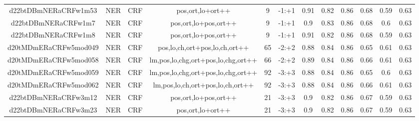 \documentclass[a4paper]{article}
\begin{document}
\begin{landscape}
\begin{center}
\begin{tabular}{ |c|c|c|c|c|c|c|c|c|c|c|c|}
 	

 
 	
 	\small{ d22btDBmNERaCRFw1m53 } & \small{ NER} & \small{  CRF }  & pos,ort,lo+ort++  &  9 &  \small{  -1:+1 }  &  0.91 & 0.82 & 0.86  &  0.68 & 0.59 & 0.63 \\
 	

 
 	
 	\small{ d22btDBmNERaCRFw1m7 } & \small{ NER} & \small{  CRF }  & pos,ort,lo+pos,ort++  &  9 &  \small{  -1:+1 }  &  0.9 & 0.83 & 0.86  &  0.68 & 0.6 & 0.63 \\
 	

 
 	
 	\small{ d22btDBmNERaCRFw1m8 } & \small{ NER} & \small{  CRF }  & pos,ort,lo+pos,ort++  &  9 &  \small{  -1:+1 }  &  0.91 & 0.82 & 0.86  &  0.68 & 0.59 & 0.63 \\
 	

 
 	
 	\small{ d20tMDmERaCRFw5mod049 } & \small{ NER} & \small{  CRF }  & pos,lo,ch,ort+pos,lo,ch,ort++  &  65 &  \small{  -2:+2 }  &  0.88 & 0.84 & 0.86  &  0.65 & 0.61 & 0.63 \\
 	

 
 	
 	\small{ d20tMDmERaCRFw5mod058 } & \small{ NER} & \small{  CRF }  & lm,pos,lo,chg,ort+pos,lo,chg,ort++  &  66 &  \small{  -2:+2 }  &  0.89 & 0.84 & 0.86  &  0.66 & 0.61 & 0.63 \\
 	

 
 	
 	\small{ d20tMDmERaCRFw5mod059 } & \small{ NER} & \small{  CRF }  & lm,pos,lo,chg,ort+pos,lo,chg,ort++  &  92 &  \small{  -3:+3 }  &  0.88 & 0.84 & 0.86  &  0.65 & 0.6 & 0.63 \\
 	

 
 	
 	\small{ d20tMDmERaCRFw5mod062 } & \small{ NER} & \small{  CRF }  & lm,pos,lo,ch,ort+pos,lo,ch,ort++  &  92 &  \small{  -3:+3 }  &  0.88 & 0.84 & 0.86  &  0.66 & 0.61 & 0.63 \\
 	

 
 	
 	\small{ d22btDBmNERaCRFw3m12 } & \small{ NER} & \small{  CRF }  & pos,ort,lo+pos,ort++  &  21 &  \small{  -3:+3 }  &  0.9 & 0.82 & 0.86  &  0.67 & 0.59 & 0.63 \\
 	

 
 	
 	\small{ d22btDBmNERaCRFw3m23 } & \small{ NER} & \small{  CRF }  & pos,ort,lo+ort++  &  21 &  \small{  -3:+3 }  &  0.9 & 0.82 & 0.86  &  0.67 & 0.59 & 0.63 \\
 	


\end{tabular}
\end{center}
\end{landscape}
\end{document}
